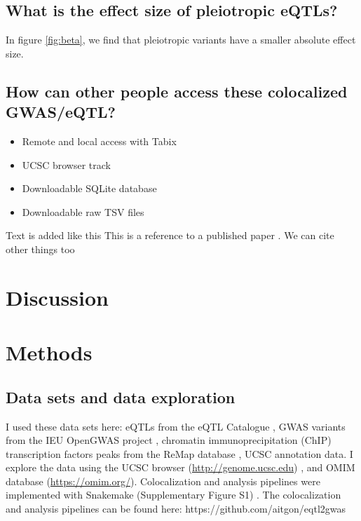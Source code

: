 \subsection*{What is the effect size of pleiotropic eQTLs?}

In figure \ref{fig:beta}, we find that pleiotropic variants have a smaller absolute effect size.

\subsection*{How can other people access these colocalized GWAS/eQTL?}

\begin{itemize}
  \item Remote and local access with Tabix
  \item UCSC browser track
  \item Downloadable SQLite database
  \item Downloadable raw TSV files
\end{itemize}

Text is added like this
This is a reference to a published paper \citep{2019.Watanabe}.
We can cite other things too \citep{watson_molecular_1953}

\section*{Discussion}

\section*{Methods}\label{sec:methods}

\subsection*{Data sets and data exploration}

I used these data sets here: eQTLs from the eQTL Catalogue \citep{2021.Alasoo.Kerimov}, GWAS variants from the IEU OpenGWAS project \citep{2021.Marcora.Lyon}, chromatin immunoprecipitation (ChIP)	transcription factors peaks from the ReMap database \citep{2021.Ballester.Hammal}, UCSC annotation data.
%
I explore the data using the UCSC browser (\url{http://genome.ucsc.edu}) \citep{2021.Kent.Lee}, and OMIM database (\url{https://omim.org/}). 
%
Colocalization and analysis pipelines were implemented with Snakemake (Supplementary Figure S1) .
%
The colocalization and analysis pipelines can be found here: https://github.com/aitgon/eqtl2gwas


